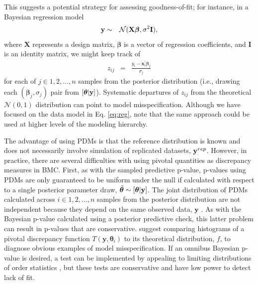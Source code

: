 \documentclass[12pt,english]{article}
\begin{document}
\begin{spacing}{1.9}
This suggests a potential strategy for assessing goodness-of-fit; for
instance, in a Bayesian regression model
\begin{eqnarray}
  \label{eq:reg}
  {\bf y} & \sim & \mathcal{N}(\textbf{X} \boldsymbol{\beta},\sigma^2 \textbf{I}),
\end{eqnarray}
where $\textbf{X}$ represents a design matrix, $\boldsymbol{\beta}$ is
a vector of regression coefficients, and $\textbf{I}$ is an identity
matrix, we might keep track of
\begin{eqnarray}
  \label{eq:resid}
  z_{ij} & = & \frac{y_i - \textbf{x}_i^\prime \boldsymbol{\beta}_j}{\sigma_j}
\end{eqnarray}
for each of $j \in {1, 2, \hdots, n}$ samples from the posterior
distribution (i.e., drawing each $(\boldsymbol{\beta}_j, \sigma_j)$
pair from $[\boldsymbol{\theta}|{\bf y}]$).  Systematic departures of
$z_{ij}$ from the theoretical $\mathcal{N}(0,1)$ distribution can
point to model misspecification.  Although we have focused on the data
model in Eq. \ref{eq:reg}, note that the same approach could be used
at higher levels of the modeling hierarchy.

The advantage of using PDMs is that the reference distribution is
known and does not necessarily involve simulation of replicated
datasets, ${\bf y}^{rep}$.  However, in practice, there are several
difficulties with using pivotal quantities as discrepancy measures in
BMC.  First, as with the sampled predictive
p-value, p-values using PDMs are only guaranteed to be uniform under
the null if calculated with respect to a single posterior parameter
draw, $\tilde{\boldsymbol{\theta}} \sim [\boldsymbol{\theta} | {\bf y}]$.  The joint
distribution of PDMs calculated across $i \in 1,2,\hdots,n$ samples
from the posterior distribution are not independent because they
depend on the same observed data, $\textbf{y}$ \citep{Johnson2004}.
As with the Bayesian p-value calculated using a posterior predictive
check, this latter problem can result in p-values that are
conservative.  \citet{YuanJohnson2012} suggest comparing histograms of
a pivotal discrepancy function $T(\textbf{y},\boldsymbol{\theta}_i)$
to its theoretical distribution, $f$, to diagnose obvious examples of
model misspecification.  If an omnibus Bayesian p-value is desired, a
test can be implemented by appealing to limiting distributions of
order statistics \citep{Johnson2004}, but these tests are conservative
and have low power to detect lack of fit.


\end{spacing}
\end{document}
